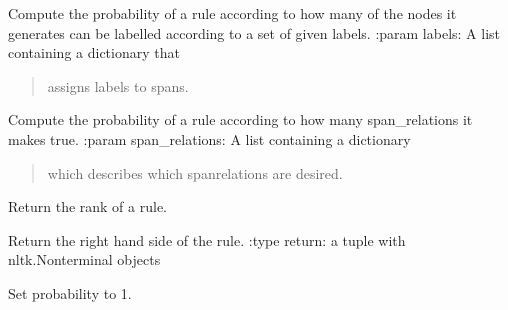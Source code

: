 \documentclass[letterpaper,10pt,english]{sphinxmanual}
\begin{document}
\begin{fulllineitems}
\begin{fulllineitems}
\label{alignments:alignments.Rule.probability_labels}
Compute the probability of a rule according
to how many of the nodes it generates can
be labelled according to a set of given
labels.
:param labels:  A list containing a dictionary that
\begin{quote}

assigns labels to spans.
\end{quote}

\end{fulllineitems}


\begin{fulllineitems}
\label{alignments:alignments.Rule.probability_spanrels}
Compute the probability of a rule according to
how many span\_relations it makes true.
:param span\_relations:  A list containing a dictionary
\begin{quote}

which describes which
spanrelations are desired.
\end{quote}

\end{fulllineitems}


\begin{fulllineitems}
\label{alignments:alignments.Rule.rank}
Return the rank of a rule.

\end{fulllineitems}


\begin{fulllineitems}
\label{alignments:alignments.Rule.rhs}
Return the right hand side of the rule.
:type return:   a tuple with nltk.Nonterminal objects

\end{fulllineitems}


\begin{fulllineitems}
\label{alignments:alignments.Rule.uniform_probability}
Set probability to 1.

\end{fulllineitems}


\end{fulllineitems}
\end{document}
